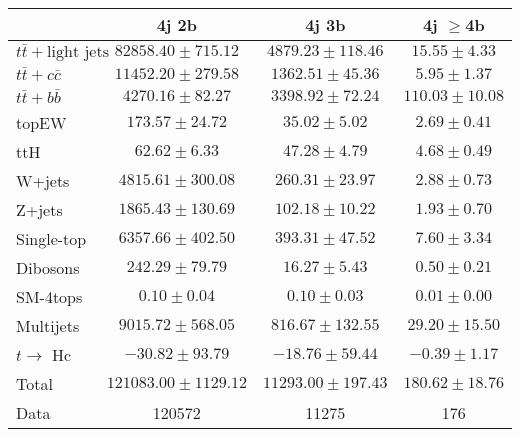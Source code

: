 \begin{table}
\begin{center}
  \begin{tabular}{ | l |  c |  c |  c | }
    \hline \hline 
     & 4j 2b  & 4j 3b  & 4j $\geq$4b  \\ 
    \hline 
     $t\bar{t}+\text{light jets}$  &   $ 82858.40 \pm 715.12 $ &   $ 4879.23 \pm 118.46 $ &   $ 15.55 \pm 4.33 $ \\ 
     $t\bar{t}+c\bar{c}$  &   $ 11452.20 \pm 279.58 $ &   $ 1362.51 \pm 45.36 $ &   $ 5.95 \pm 1.37 $ \\ 
     $t\bar{t}+b\bar{b}$  &   $ 4270.16 \pm 82.27 $ &   $ 3398.92 \pm 72.24 $ &   $ 110.03 \pm 10.08 $ \\ 
    topEW  &   $ 173.57 \pm 24.72 $ &   $ 35.02 \pm 5.02 $ &   $ 2.69 \pm 0.41 $ \\ 
    ttH  &   $ 62.62 \pm 6.33 $ &   $ 47.28 \pm 4.79 $ &   $ 4.68 \pm 0.49 $ \\ 
    W+jets  &   $ 4815.61 \pm 300.08 $ &   $ 260.31 \pm 23.97 $ &   $ 2.88 \pm 0.73 $ \\ 
    Z+jets  &   $ 1865.43 \pm 130.69 $ &   $ 102.18 \pm 10.22 $ &   $ 1.93 \pm 0.70 $ \\ 
    Single-top  &   $ 6357.66 \pm 402.50 $ &   $ 393.31 \pm 47.52 $ &   $ 7.60 \pm 3.34 $ \\ 
    Dibosons  &   $ 242.29 \pm 79.79 $ &   $ 16.27 \pm 5.43 $ &   $ 0.50 \pm 0.21 $ \\ 
    SM-4tops  &   $ 0.10 \pm 0.04 $ &   $ 0.10 \pm 0.03 $ &   $ 0.01 \pm 0.00 $ \\ 
    Multijets  &   $ 9015.72 \pm 568.05 $ &   $ 816.67 \pm 132.55 $ &   $ 29.20 \pm 15.50 $ \\ 
     $t\rightarrow$ Hc  &   $ -30.82 \pm 93.79 $ &   $ -18.76 \pm 59.44 $ &   $ -0.39 \pm 1.17 $ \\ 
    Total  &   $ 121083.00 \pm 1129.12 $ &   $ 11293.00 \pm 197.43 $ &   $ 180.62 \pm 18.76 $ \\ 
    \hline 
    Data  & 120572  & 11275  & 176  \\ 
    \hline \hline 
  \end{tabular} 



\end{center}
\end{table}
